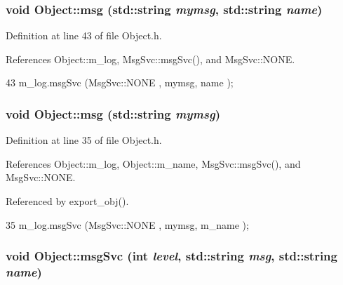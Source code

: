 \hypertarget{classObject_ac5d59299273cee27aacf7de00d2e7034}{
\subsubsection[{msg}]{\setlength{\rightskip}{0pt plus 5cm}void Object::msg (std::string {\em mymsg}, \/  std::string {\em name})}}
\label{classObject_ac5d59299273cee27aacf7de00d2e7034}


Definition at line 43 of file Object.h.

References Object::m\_\-log, MsgSvc::msgSvc(), and MsgSvc::NONE.


\begin{DoxyCode}
43 { m_log.msgSvc (MsgSvc::NONE    , mymsg, name ); }
\end{DoxyCode}
\hypertarget{classObject_a58b2d0618c2d08cf2383012611528d97}{
\subsubsection[{msg}]{\setlength{\rightskip}{0pt plus 5cm}void Object::msg (std::string {\em mymsg})}}
\label{classObject_a58b2d0618c2d08cf2383012611528d97}


Definition at line 35 of file Object.h.

References Object::m\_\-log, Object::m\_\-name, MsgSvc::msgSvc(), and MsgSvc::NONE.

Referenced by export\_\-obj().


\begin{DoxyCode}
35 { m_log.msgSvc (MsgSvc::NONE    , mymsg, m_name ); }
\end{DoxyCode}
\hypertarget{classObject_a3f9d5537ebce0c0f2bf6ae4d92426f3c}{
\subsubsection[{msgSvc}]{\setlength{\rightskip}{0pt plus 5cm}void Object::msgSvc (int {\em level}, \/  std::string {\em msg}, \/  std::string {\em name})}}
\label{classObject_a3f9d5537ebce0c0f2bf6ae4d92426f3c}


